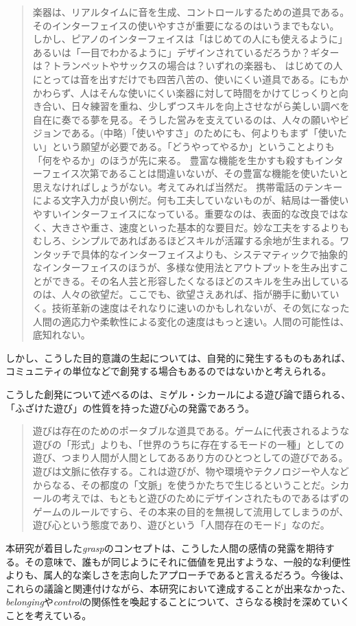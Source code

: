 \begin{quote}
  楽器は、リアルタイムに音を生成、コントロールするための道具である。そのインターフェイスの使いやすさが重要になるのはいうまでもない。 しかし、ピアノのインターフェイスは「はじめての人にも使えるように」あるいは「一目でわかるように」デザインされているだろうか？ギターは？トランペットやサックスの場合は？いずれの楽器も、 はじめての人にとっては音を出すだけでも四苦八苦の、使いにくい道具である。にもかかわらず、人はそんな使いにくい楽器に対して時間をかけてじっくりと向き合い、日々練習を重ね、少しずつスキルを向上させながら美しい調べを自在に奏でる夢を見る。そうした営みを支えているのは、人々の願いやビジョンである。(中略)「使いやすさ」のためにも、何よりもまず「使いたい」という願望が必要である。「どうやってやるか」ということよりも「何をやるか」のほうが先に来る。 豊富な機能を生かすも殺すもインターフェイス次第であることは間違いないが、その豊富な機能を使いたいと思えなければしょうがない。考えてみれば当然だ。 携帯電話のテンキーによる文字入力が良い例だ。何も工夫していないものが、結局は一番使いやすいインターフェイスになっている。重要なのは、表面的な改良ではなく、大きさや重さ、速度といった基本的な要目だ。妙な工夫をするよりもむしろ、シンプルであればあるほどスキルが活躍する余地が生まれる。ワンタッチで具体的なインターフェイスよりも、システマティックで抽象的なインターフェイスのほうが、多様な使用法とアウトプットを生み出すことができる。その名人芸と形容したくなるほどのスキルを生み出しているのは、人々の欲望だ。ここでも、欲望さえあれば、指が勝手に動いていく。技術革新の速度はそれなりに速いのかもしれないが、その気になった人間の適応力や柔軟性による変化の速度はもっと速い。人間の可能性は、底知れない。
\end{quote}

しかし、こうした目的意識の生起については、自発的に発生するものもあれば、コミュニティの単位などで創発する場合もあるのではないかと考えられる。

こうした創発について述べるのは、ミゲル・シカールによる遊び論で語られる、「ふざけた遊び」の性質を持った遊び心の発露であろう。

\begin{quote}
  遊びは存在のためのポータブルな道具である。ゲームに代表されるような遊びの「形式」よりも、「世界のうちに存在するモードの一種」としての遊び、つまり人間が人間としてあるあり方のひとつとしての遊びである。遊びは文脈に依存する。これは遊びが、物や環境やテクノロジーや人などからなる、その都度の「文脈」を使うかたちで生じるということだ。シカールの考えでは、もともと遊びのためにデザインされたものであるはずのゲームのルールですら、その本来の目的を無視して流用してしまうのが、遊び心という態度であり、遊びという「人間存在のモード」なのだ。  
\end{quote}

本研究が着目した\textit{grasp}のコンセプトは、こうした人間の感情の発露を期待する。その意味で、誰もが同じようにそれに価値を見出すような、一般的な利便性よりも、属人的な楽しさを志向したアプローチであると言えるだろう。今後は、これらの議論と関連付けながら、本研究において達成することが出来なかった、\textit{belonging}や\textit{control}の関係性を喚起することについて、さらなる検討を深めていくことを考えている。